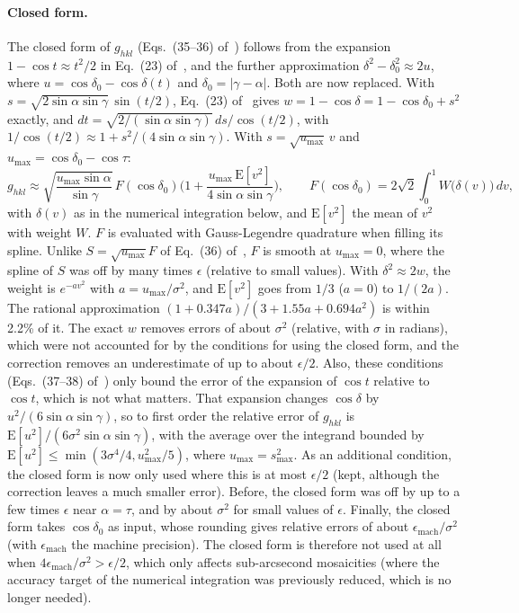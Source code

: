 \documentclass[11pt,a4paper]{article}
\newcommand{\Eq}[1]{Eq.~(#1) of~\cite{elastic}}
\newcommand{\Eqs}[1]{Eqs.~(#1) of~\cite{elastic}}
\begin{document}
\paragraph{Closed form.} The closed form of $g_{hkl}$ (\Eqs{35--36}) follows
from the expansion $1-\cos t \approx t^2/2$ in \Eq{23}, and the further
approximation $\delta^2-\delta_0^2 \approx 2u$, where
$u = \cos\delta_0-\cos\delta(t)$ and $\delta_0 = |\gamma-\alpha|$. Both are
now replaced. With $s = \sqrt{2\sin\alpha\sin\gamma}\,\sin(t/2)$, \Eq{23}
gives $w = 1-\cos\delta = 1-\cos\delta_0+s^2$ exactly, and
$dt = \sqrt{2/(\sin\alpha\sin\gamma)}\,ds/\cos(t/2)$, with
$1/\cos(t/2) \approx 1+s^2/(4\sin\alpha\sin\gamma)$. With
$s = \sqrt{u_\text{max}}\,v$ and $u_\text{max} = \cos\delta_0-\cos\tau$:
\begin{equation}
  g_{hkl} \approx \sqrt{\frac{u_\text{max}\sin\alpha}{\sin\gamma}}\,
  F(\cos\delta_0)\Big(1+\frac{u_\text{max}\,\mathrm{E}[v^2]}
  {4\sin\alpha\sin\gamma}\Big),
  \qquad F(\cos\delta_0) = 2\sqrt2\int_0^1 W\big(\delta(v)\big)\,dv,
\end{equation}
with $\delta(v)$ as in the numerical integration below, and $\mathrm{E}[v^2]$
the mean of $v^2$ with weight $W$. $F$ is evaluated with Gauss-Legendre
quadrature when filling its spline. Unlike $S = \sqrt{u_\text{max}}F$ of
\Eq{36}, $F$ is smooth at $u_\text{max} = 0$, where the spline of $S$ was off
by many times $\epsilon$ (relative to small values). With
$\delta^2 \approx 2w$, the weight is $e^{-av^2}$ with
$a = u_\text{max}/\sigma^2$, and $\mathrm{E}[v^2]$ goes from $1/3$ ($a=0$)
to $1/(2a)$. The rational approximation
$(1+0.347a)/(3+1.55a+0.694a^2)$ is within 2.2\% of it. The exact $w$ removes
errors of about $\sigma^2$ (relative, with $\sigma$ in radians), which were
not accounted for by the conditions for using the closed form, and the
correction removes an underestimate of up to about $\epsilon/2$. Also, these
conditions (\Eqs{37--38}) only bound the
error of the expansion of $\cos t$ relative to $\cos t$, which is not what
matters. That expansion changes $\cos\delta$ by $u^2/(6\sin\alpha\sin\gamma)$,
so to first order the relative error of $g_{hkl}$ is
$\mathrm{E}[u^2]/(6\sigma^2\sin\alpha\sin\gamma)$, with the average over
the integrand bounded by
$\mathrm{E}[u^2] \le \min(3\sigma^4/4,u_\text{max}^2/5)$, where
$u_\text{max} = s_\text{max}^2$. As an additional condition, the closed form
is now only used where this is at most $\epsilon/2$ (kept, although the
correction leaves a much smaller error). Before, the closed form
was off by up to a few times $\epsilon$ near $\alpha = \tau$, and by about
$\sigma^2$ for small values of $\epsilon$. Finally, the closed form takes
$\cos\delta_0$ as input, whose rounding gives relative errors of about
$\epsilon_\text{mach}/\sigma^2$ (with $\epsilon_\text{mach}$ the machine
precision). The closed form is therefore not used at all when
$4\epsilon_\text{mach}/\sigma^2 > \epsilon/2$, which only affects
sub-arcsecond mosaicities (where the accuracy target of the numerical
integration was previously reduced, which is no longer needed).
\end{document}
